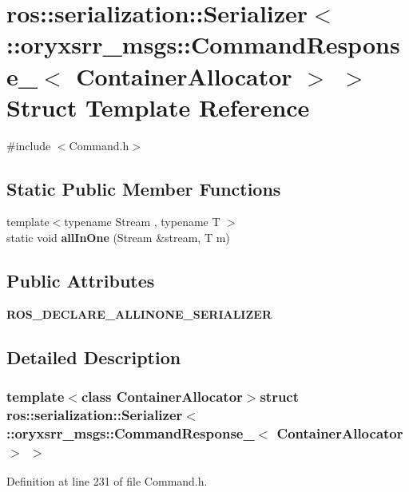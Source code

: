 \section{ros\-:\-:serialization\-:\-:\-Serializer$<$ \-:\-:oryxsrr\-\_\-msgs\-:\-:\-Command\-Response\-\_\-$<$ \-Container\-Allocator $>$ $>$ \-Struct \-Template \-Reference}
\label{structros_1_1serialization_1_1Serializer_3_01_1_1oryxsrr__msgs_1_1CommandResponse___3_01ContainerAllocator_01_4_01_4}


{\ttfamily \#include $<$\-Command.\-h$>$}

\subsection*{\-Static \-Public \-Member \-Functions}
\begin{DoxyCompactItemize}
\item 
{\footnotesize template$<$typename Stream , typename T $>$ }\\static void {\bf all\-In\-One} (\-Stream \&stream, \-T m)
\end{DoxyCompactItemize}
\subsection*{\-Public \-Attributes}
\begin{DoxyCompactItemize}
\item 
{\bf \-R\-O\-S\-\_\-\-D\-E\-C\-L\-A\-R\-E\-\_\-\-A\-L\-L\-I\-N\-O\-N\-E\-\_\-\-S\-E\-R\-I\-A\-L\-I\-Z\-E\-R}
\end{DoxyCompactItemize}


\subsection{\-Detailed \-Description}
\subsubsection*{template$<$class Container\-Allocator$>$struct ros\-::serialization\-::\-Serializer$<$ \-::oryxsrr\-\_\-msgs\-::\-Command\-Response\-\_\-$<$ Container\-Allocator $>$ $>$}



\-Definition at line 231 of file \-Command.\-h.



